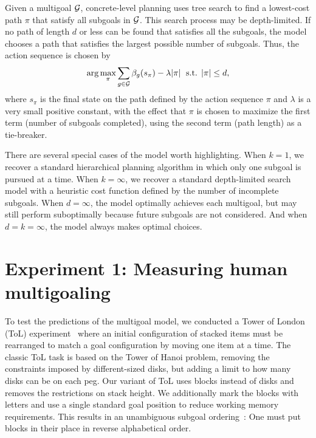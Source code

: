 \documentclass[10pt,letterpaper]{article}
\begin{document}
Given a multigoal $\mathcal{G}$, concrete-level planning uses tree search to find a lowest-cost path $\pi$ that satisfy all subgoals in $\mathcal{G}$. This search process may be depth-limited. If no path of length $d$ or less can be found that satisfies all the subgoals, the model chooses a path that satisfies the largest possible number of subgoals. Thus, the action sequence is chosen by
%
\begin{equation}\label{eq:concrete}
  \arg\max_\pi 
    \sum_{g \in \mathcal{G}} \beta_g(s_\pi) - \lambda |\pi |
    \; \text{ s.t.  } |\pi| \leq d,
\end{equation}
%
where $s_\pi$ is the final state on the path defined by the action sequence $\pi$ and $\lambda$ is a very small positive constant, with the effect that $\pi$ is chosen to maximize the first term (number of subgoals completed), using the second term (path length) as a tie-breaker.

There are several special cases of the model worth highlighting. When $k = 1$, we recover a standard hierarchical planning algorithm in which only one subgoal is pursued at a time. When $k = \infty$, we recover a standard depth-limited search model with a heuristic cost function defined by the number of incomplete subgoals. When $d = \infty$, the model optimally achieves each multigoal, but may still perform suboptimally because future subgoals are not considered. And when $d = k = \infty$, the model always makes optimal choices.


\section{Experiment 1: Measuring human multigoaling}

To test the predictions of the multigoal model, we conducted a Tower of London (ToL) experiment~\citep{Shallice1982} where an initial configuration of stacked items must be rearranged to match a goal configuration by moving one item at a time. The classic ToL task is based on the Tower of Hanoi problem, removing the constraints imposed by different-sized disks, but adding a limit to how many disks can be on each peg. Our variant of ToL uses blocks instead of disks and removes the restrictions on stack height. We additionally mark the blocks with letters and use a single standard goal position to reduce working memory requirements. This results in an unambiguous subgoal ordering~\citep{Kaller2011}: One must put blocks in their place in reverse alphabetical order.
\end{document}
